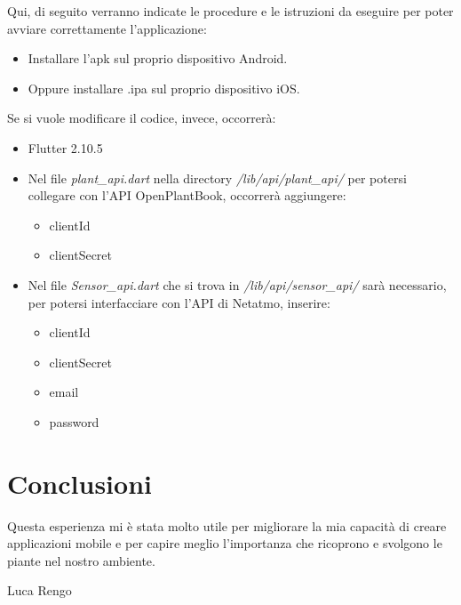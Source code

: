 \documentclass[a4paper,12pt]{report}
\begin{document}
\textsf{\small Qui, di seguito verranno indicate le procedure e le istruzioni da eseguire per poter avviare correttamente l'applicazione: }

\begin{itemize}
	\item \textsf{\small Installare l'apk sul proprio dispositivo Android.}
	\item \textsf{\small Oppure installare .ipa sul proprio dispositivo iOS.}
\end{itemize}

\textsf{\small Se si vuole modificare il codice, invece, occorrerà:}

\begin{itemize}
	\item \textsf{\small Flutter 2.10.5}
	\item \textsf{\small Nel file \emph{plant\_api.dart} nella directory \emph{/lib/api/plant\_api/} per potersi collegare con l'API OpenPlantBook, occorrerà aggiungere: }
	\begin{itemize}
		\item \textsf{\small clientId}
		\item \textsf{\small clientSecret}
	\end{itemize}
	\item \textsf{\small Nel file \emph{Sensor\_api.dart} che si trova in \emph{/lib/api/sensor\_api/} sarà necessario, per potersi interfacciare con l'API di Netatmo, inserire: }
	\begin{itemize}
		\item \textsf{\small clientId}
		\item \textsf{\small clientSecret}
		\item \textsf{\small email}
		\item \textsf{\small password}
	\end{itemize}
\end{itemize}


\section{Conclusioni}

\textsf{\small Questa esperienza mi è stata molto utile per migliorare la mia capacità di creare applicazioni mobile e per capire meglio l'importanza che ricoprono e svolgono le piante nel nostro ambiente.}\break

\textsf{\small Luca Rengo}
\end{document}
